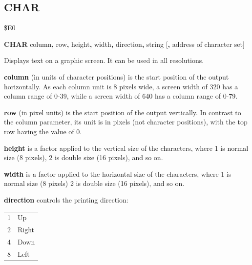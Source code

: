 
\newpage
\subsection{CHAR}
\begin{description}[leftmargin=2cm,style=nextline]
\item [Token:] \$E0
\item [Format:] {\bf CHAR} column{\bf,} row{\bf,} height{\bf,} width{\bf,}
		direction{\bf,} string [{\bf,} address of character set]
\item [Usage:]  Displays text on a graphic screen.
                It can be used in all resolutions.

                {\bf column} (in units of character positions) is the
                start position of the output horizontally.
                As each column unit is 8 pixels wide, a screen width of 320
                has a column range of 0-39, while a screen width of 640
                has a column range of 0-79.

                {\bf row} (in pixel units) is the start position of the output
                vertically. In contrast to the column parameter,
                its unit is in pixels (not character positions), with the top
                row having the value of 0.

                {\bf height} is a factor applied to the vertical
                size of the characters, where 1 is normal size (8 pixels),
                2 is double size (16 pixels), and so on.

                {\bf width} is a factor applied to the horizontal
                size of the characters, where 1 is normal size (8 pixels)
                2 is double size (16 pixels), and so on.

                {\bf direction} controls the printing direction: \\
                    \begin{center}
                    \begin{tabular}{|c|l|}
                        \hline
                        1	& Up \\
                        2	& Right \\
                        4	& Down \\
                        8	& Left \\
                        \hline
                    \end{tabular}
                    \end{center}


\end{description}

